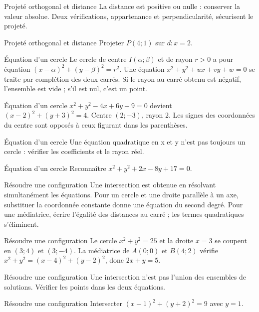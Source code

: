 \documentclass[aspectratio=169,10pt]{beamer}
\begin{document}
\begin{frame}{Projeté orthogonal et distance}
La distance est positive ou nulle : conserver la valeur absolue. Deux vérifications, appartenance et perpendicularité, sécurisent le projeté.
\end{frame}
\begin{frame}{Projeté orthogonal et distance}
Projeter \(P(4;1)\) sur \(d:x=2\).
\end{frame}
\begin{frame}{Équation d’un cercle}
Le cercle de centre \(I(\alpha;\beta)\) et de rayon \(r>0\) a pour équation \((x-\alpha)^2+(y-\beta)^2=r^2\). Une équation \(x^2+y^2+ux+vy+w=0\) se traite par complétion des deux carrés. Si le rayon au carré obtenu est négatif, l’ensemble est vide ; s’il est nul, c’est un point.
\end{frame}
\begin{frame}{Équation d’un cercle}
\(x^2+y^2-4x+6y+9=0\) devient \((x-2)^2+(y+3)^2=4\). Centre \((2;-3)\), rayon 2. Les signes des coordonnées du centre sont opposés à ceux figurant dans les parenthèses.
\end{frame}
\begin{frame}{Équation d’un cercle}
Une équation quadratique en x et y n’est pas toujours un cercle : vérifier les coefficients et le rayon réel.
\end{frame}
\begin{frame}{Équation d’un cercle}
Reconnaître \(x^2+y^2+2x-8y+17=0\).
\end{frame}
\begin{frame}{Résoudre une configuration}
Une intersection est obtenue en résolvant simultanément les équations. Pour un cercle et une droite parallèle à un axe, substituer la coordonnée constante donne une équation du second degré. Pour une médiatrice, écrire l’égalité des distances au carré ; les termes quadratiques s’éliminent.
\end{frame}
\begin{frame}{Résoudre une configuration}
Le cercle \(x^2+y^2=25\) et la droite \(x=3\) se coupent en \((3;4)\) et \((3;-4)\). La médiatrice de \(A(0;0)\) et \(B(4;2)\) vérifie \(x^2+y^2=(x-4)^2+(y-2)^2\), donc \(2x+y=5\).
\end{frame}
\begin{frame}{Résoudre une configuration}
Une intersection n’est pas l’union des ensembles de solutions. Vérifier les points dans les deux équations.
\end{frame}
\begin{frame}{Résoudre une configuration}
Intersecter \((x-1)^2+(y+2)^2=9\) avec \(y=1\).
\end{frame}
\end{document}
